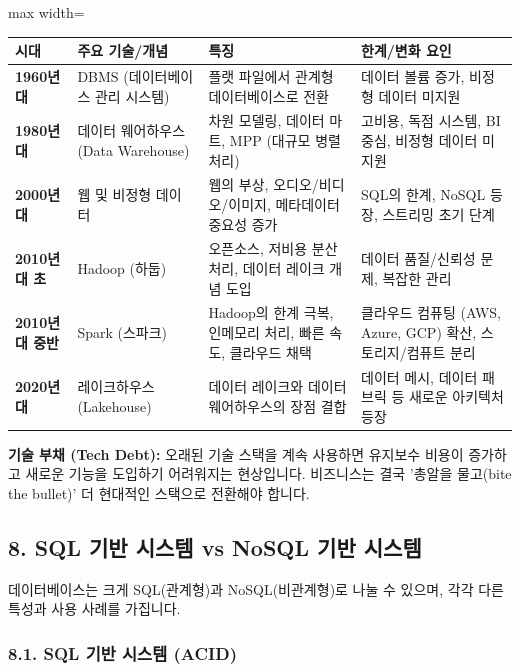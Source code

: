 \documentclass[11pt,a4paper]{article}
\begin{document}
\begin{adjustbox}{max width=\textwidth}
\begin{tabular}{llll}
\toprule
\textbf{시대} & \textbf{주요 기술/개념} & \textbf{특징} & \textbf{한계/변화 요인} \\
\midrule
\textbf{1960년대} & DBMS (데이터베이스 관리 시스템) & 플랫 파일에서 관계형 데이터베이스로 전환 & 데이터 볼륨 증가, 비정형 데이터 미지원 \\
\textbf{1980년대} & 데이터 웨어하우스 (Data Warehouse) & 차원 모델링, 데이터 마트, MPP (대규모 병렬 처리) & 고비용, 독점 시스템, BI 중심, 비정형 데이터 미지원 \\
\textbf{2000년대} & 웹 및 비정형 데이터 & 웹의 부상, 오디오/비디오/이미지, 메타데이터 중요성 증가 & SQL의 한계, NoSQL 등장, 스트리밍 초기 단계 \\
\textbf{2010년대 초} & Hadoop (하둡) & 오픈소스, 저비용 분산 처리, 데이터 레이크 개념 도입 & 데이터 품질/신뢰성 문제, 복잡한 관리 \\
\textbf{2010년대 중반} & Spark (스파크) & Hadoop의 한계 극복, 인메모리 처리, 빠른 속도, 클라우드 채택 & 클라우드 컴퓨팅 (AWS, Azure, GCP) 확산, 스토리지/컴퓨트 분리 \\
\textbf{2020년대} & 레이크하우스 (Lakehouse) & 데이터 레이크와 데이터 웨어하우스의 장점 결합 & 데이터 메시, 데이터 패브릭 등 새로운 아키텍처 등장 \\
\bottomrule
\end{tabular}
\end{adjustbox}

\begin{notebox}
\textbf{기술 부채 (Tech Debt):} 오래된 기술 스택을 계속 사용하면 유지보수 비용이 증가하고 새로운 기능을 도입하기 어려워지는 현상입니다. 비즈니스는 결국 '총알을 물고(bite the bullet)' 더 현대적인 스택으로 전환해야 합니다.
\end{notebox}

\subsection*{8. SQL 기반 시스템 vs NoSQL 기반 시스템}

데이터베이스는 크게 SQL(관계형)과 NoSQL(비관계형)로 나눌 수 있으며, 각각 다른 특성과 사용 사례를 가집니다.

\subsubsection*{8.1. SQL 기반 시스템 (ACID)}
\end{document}
